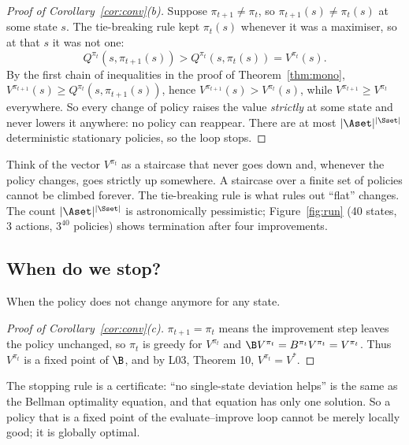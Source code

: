 \documentclass[11pt,a4paper]{article}
\theoremstyle{plain}
\theoremstyle{definition}
\theoremstyle{remark}
\begin{document}
\begin{proof}[Proof of Corollary~\ref{cor:conv}(b)]
Suppose $\pi_{t+1}\ne\pi_t$, so $\pi_{t+1}(s)\ne\pi_t(s)$ at some state $s$. The tie-breaking rule kept $\pi_t(s)$ whenever it was a maximiser, so at that $s$ it was not one:
\[
Q^{\pi_t}(s,\pi_{t+1}(s))>Q^{\pi_t}(s,\pi_t(s))=V^{\pi_t}(s).
\]
By the first chain of inequalities in the proof of Theorem~\ref{thm:mono}, $V^{\pi_{t+1}}(s)\ge Q^{\pi_t}(s,\pi_{t+1}(s))$, hence $V^{\pi_{t+1}}(s)>V^{\pi_t}(s)$, while $V^{\pi_{t+1}}\ge V^{\pi_t}$ everywhere. So every change of policy raises the value \emph{strictly} at some state and never lowers it anywhere: no policy can reappear. There are at most $|\Aset|^{|\Sset|}$ deterministic stationary policies, so the loop stops.
\end{proof}

\begin{intuition}
Think of the vector $V^{\pi_t}$ as a staircase that never goes down and, whenever the policy changes, goes strictly up somewhere. A staircase over a finite set of policies cannot be climbed forever. The tie-breaking rule is what rules out ``flat'' changes. The count $|\Aset|^{|\Sset|}$ is astronomically pessimistic; Figure~\ref{fig:run} (40 states, 3 actions, $3^{40}$ policies) shows termination after four improvements.
\end{intuition}

\subsection{When do we stop?}\label{sec:terminate}
When the policy does not change anymore for any state.

\begin{proof}[Proof of Corollary~\ref{cor:conv}(c)]
$\pi_{t+1}=\pi_t$ means the improvement step leaves the policy unchanged, so $\pi_t$ is greedy for $V^{\pi_t}$ and $\B V^{\pi_t}=B^{\pi_t}V^{\pi_t}=V^{\pi_t}$. Thus $V^{\pi_t}$ is a fixed point of $\B$, and by L03, Theorem 10, $V^{\pi_t}=V^*$.
\end{proof}

\begin{intuition}
The stopping rule is a certificate: ``no single-state deviation helps'' is the same as the Bellman optimality equation, and that equation has only one solution. So a policy that is a fixed point of the evaluate--improve loop cannot be merely locally good; it is globally optimal.
\end{intuition}
\end{document}
